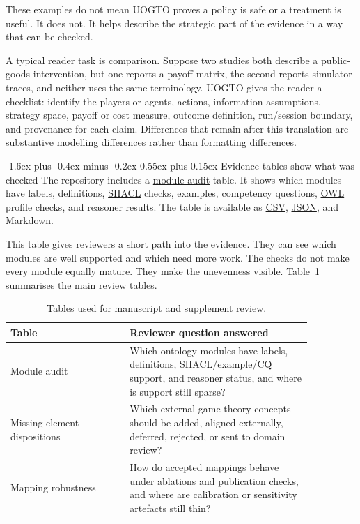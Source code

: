 \documentclass[11pt]{article}
\makeatletter
\renewcommand\subsection{\@startsection{subsection}{2}{\z@}%
  {-1.6ex plus -0.4ex minus -0.2ex}%
  {0.55ex plus 0.15ex}%
  {\normalfont\large\bfseries\color{uogtoInk}}}
\newcommand{\glslink}[2]{\hyperlink{gloss:#1}{#2}}
\newcommand{\abblink}[2]{\hyperlink{abbr:#1}{#2}}
\makeatother
\begin{document}
These examples do not mean UOGTO proves a policy is safe or a treatment is useful. It does not. It helps describe the strategic part of the evidence in a way that can be checked.

A typical reader task is comparison. Suppose two studies both describe a public-goods intervention, but one reports a payoff matrix, the second reports simulator traces, and neither uses the same terminology. UOGTO gives the reader a checklist: identify the players or agents, actions, information assumptions, strategy space, payoff or cost measure, outcome definition, run/session boundary, and provenance for each claim. Differences that remain after this translation are substantive modelling differences rather than formatting differences.

\subsection{Evidence tables show what was checked}
The repository includes a \glslink{module-audit}{module audit} table. It shows which modules have labels, definitions, \abblink{shacl}{SHACL} checks, examples, competency questions, \abblink{owl}{OWL} profile checks, and reasoner results. The table is available as \abblink{csv}{CSV}, \abblink{json}{JSON}, and Markdown.

This table gives reviewers a short path into the evidence. They can see which modules are well supported and which need more work. The checks do not make every module equally mature. They make the unevenness visible. Table~\ref{tab:module-audit} summarises the main review tables.

\begin{table}[ht]
\centering
\caption{Tables used for manuscript and supplement review.}
\label{tab:module-audit}
\begin{tabular}{p{0.34\linewidth}p{0.52\linewidth}}
\toprule
Table & Reviewer question answered \\
\midrule
Module audit & Which ontology modules have labels, definitions, SHACL/example/CQ support, and reasoner status, and where is support still sparse? \\
Missing-element dispositions & Which external game-theory concepts should be added, aligned externally, deferred, rejected, or sent to domain review? \\
Mapping robustness & How do accepted mappings behave under ablations and publication checks, and where are calibration or sensitivity artefacts still thin? \\
\bottomrule
\end{tabular}
\end{table}
\end{document}
